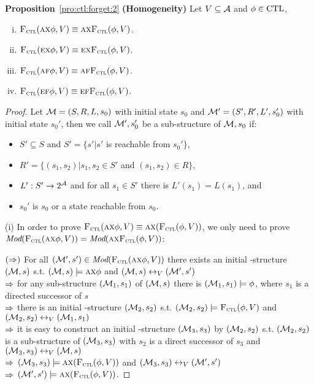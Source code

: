 \documentclass{article}
\begin{document}
 \textbf{Proposition}~\ref{pro:ctl:forget:2} \textbf{(Homogeneity)}
 Let $V\subseteq\cal A$ and $\phi \in \textrm{CTL}$,%
   \begin{enumerate}[(i)]
     \item ${\textsc{F}_{\textsc{ctl}}}(\textsc{a}\textsc{x}\phi,V)\equiv \textsc{a}\textsc{x} {\textsc{F}_{\textsc{ctl}}}(\phi,V)$.
     \item ${\textsc{F}_{\textsc{ctl}}}(\textsc{e}\textsc{x}\phi,V)\equiv\textsc{e}\textsc{x} {\textsc{F}_{\textsc{ctl}}}(\phi,V)$.
     \item ${\textsc{F}_{\textsc{ctl}}}(\textsc{a} \textsc{f}\phi,V)\equiv \textsc{a} \textsc{f} {\textsc{F}_{\textsc{ctl}}}(\phi,V)$.
     \item ${\textsc{F}_{\textsc{ctl}}}(\textsc{e}\textsc{f}\phi,V)\equiv\textsc{e}\textsc{f} {\textsc{F}_{\textsc{ctl}}}(\phi,V)$.
   \end{enumerate}
 \begin{proof}
 Let ${\cal M}=(S, R, L,s_0)$ with initial state $s_0$ and ${\cal M}'=(S', R', L',s_0')$ with initial state $s_0'$, then we call ${\cal M}', s_0'$ be a sub-structure of ${\cal M},s_0$ if:
 \begin{itemize}
   \item $S' \subseteq S$ and $S'=\{s' | s'$ is reachable from $s_0'\}$,
   \item $R' =\{(s_1, s_2)| s_1, s_2 \in S'$ and $(s_1, s_2) \in R\}$,
   \item $L': S' \rightarrow 2^{\cal A}$ and for all $s_1 \in S'$ there is $L'(s_1) = L(s_1)$, and
   \item $s_0'$ is $s_0$ or a state reachable from $s_0$.
 \end{itemize}

 (i) In order to prove ${\textsc{F}_{\textsc{ctl}}}(\textsc{a} \textsc{x} \phi, V) \equiv \textsc{a} \textsc{x}({\textsc{F}_{\textsc{ctl}}}(\phi, V))$, we only need to prove $\textit{Mod}({\textsc{F}_{\textsc{ctl}}}(\textsc{a} \textsc{x} \phi, V)) = \textit{Mod}( \textsc{a}\textsc{x}{\textsc{F}_{\textsc{ctl}}}(\phi, V))$:

 $(\Rightarrow)$ For all $({\cal M}', s') \in \textit{Mod}({\textsc{F}_{\textsc{ctl}}}(\textsc{a} \textsc{x} \phi, V))$ there exists an initial \MPK-structure $({\cal M}, s)$ s.t. $({\cal M}, s)\models \textsc{a} \textsc{x} \phi$ and $({\cal M}, s) \leftrightarrow_V ({\cal M}',s')$\\
 $\Rightarrow$ for any sub-structure $({\cal M}_1, s_1)$ of $({\cal M}, s)$ there is $({\cal M}_1, s_1) \models \phi$, where $s_1$ is a directed successor of $s$ \\
 $\Rightarrow$ there is an initial \MPK-structure $({\cal M}_2, s_2)$ s.t. $({\cal M}_2, s_2) \models {\textsc{F}_{\textsc{ctl}}}(\phi,V)$ and $({\cal M}_2, s_2) \leftrightarrow_V ({\cal M}_1,s_1)$\\
 $\Rightarrow$ it is easy to construct an initial \MPK-structure $({\cal M}_3, s_3)$ by $({\cal M}_2, s_2)$ s.t. $({\cal M}_2, s_2)$ is a sub-structure of $({\cal M}_3, s_3)$ with $s_2$ is a direct successor of $s_3$ and $({\cal M}_3, s_3) \leftrightarrow_V ({\cal M},s)$\\
 $\Rightarrow$ $({\cal M}_3, s_3) \models \textsc{a} \textsc{x} ({\textsc{F}_{\textsc{ctl}}}(\phi,V))$ and $({\cal M}_3, s_3) \leftrightarrow_V ({\cal M}',s')$\\
 $\Rightarrow$ $({\cal M}', s') \models \textsc{a} \textsc{x} ({\textsc{F}_{\textsc{ctl}}}(\phi,V))$.


\end{proof}
\end{document}
